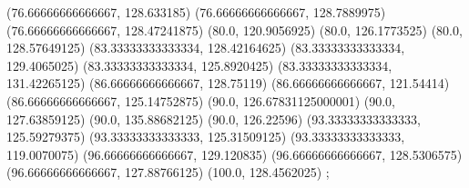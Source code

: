 {{{		(76.66666666666667, 128.633185)
		(76.66666666666667, 128.7889975)
		(76.66666666666667, 128.47241875)
		(80.0, 120.9056925)
		(80.0, 126.1773525)
		(80.0, 128.57649125)
		(83.33333333333334, 128.42164625)
		(83.33333333333334, 129.4065025)
		(83.33333333333334, 125.8920425)
		(83.33333333333334, 131.42265125)
		(86.66666666666667, 128.75119)
		(86.66666666666667, 121.54414)
		(86.66666666666667, 125.14752875)
		(90.0, 126.67831125000001)
		(90.0, 127.63859125)
		(90.0, 135.88682125)
		(90.0, 126.22596)
		(93.33333333333333, 125.59279375)
		(93.33333333333333, 125.31509125)
		(93.33333333333333, 119.0070075)
		(96.66666666666667, 129.120835)
		(96.66666666666667, 128.5306575)
		(96.66666666666667, 127.88766125)
		(100.0, 128.4562025)
	};

}
}
